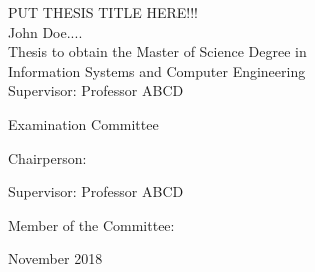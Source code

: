 \begin{center}
%
\vspace{2.5cm}

\vspace{1.0cm}
{\FontLb PUT THESIS TITLE HERE!!!} \\
\vspace{2.7cm}
{\FontMb John Doe....} \\
\vspace{2.0cm}
{\FontSn Thesis to obtain the Master of Science Degree in} \\
\vspace{0.3cm}
{\FontLb Information Systems and Computer Engineering} \\
\vspace{1.1cm}
{\FontSn %
Supervisor: Professor ABCD
}

\vspace{1.1cm}

{\FontMb Examination Committee} \\

\vspace{0.3cm}

{\FontSn %
Chairperson: 

Supervisor: Professor ABCD

Member of the Committee: 

}

\vspace{1.5cm}
{\FontMb November 2018} \\
%
\end{center}

\cleardoublepage




